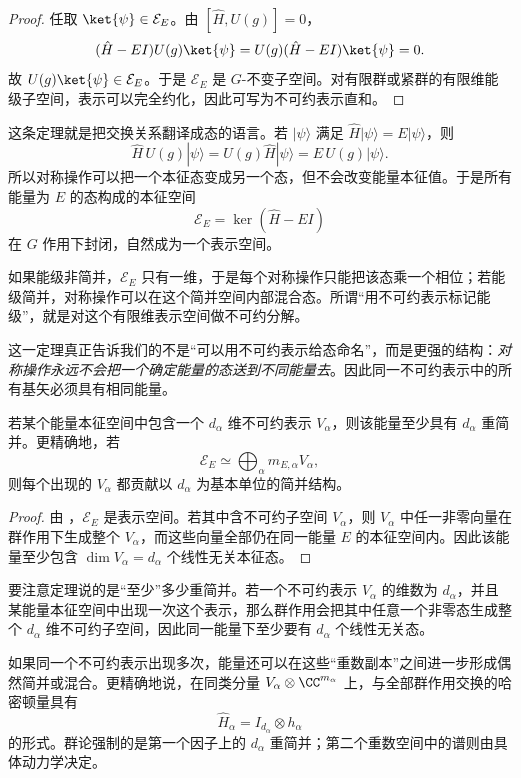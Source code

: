 \begin{proof}
任取 $\ket{\psi}\in\mathcal E_E$。由 $[\hat H,U(g)]=0$，
\[
(\hat H-EI)U(g)\ket{\psi}
=U(g)(\hat H-EI)\ket{\psi}=0.
\]
故 $U(g)\ket{\psi}\in\mathcal E_E$。于是 $\mathcal E_E$ 是 $G$-不变子空间。对有限群或紧群的有限维能级子空间，表示可以完全约化，因此可写为不可约表示直和。
\end{proof}

这条定理就是把交换关系翻译成态的语言。若 $|\psi\rangle$ 满足 $\hat H|\psi\rangle=E|\psi\rangle$，则
\[
\hat H\,U(g)|\psi\rangle
=U(g)\hat H|\psi\rangle
=E\,U(g)|\psi\rangle.
\]
所以对称操作可以把一个本征态变成另一个态，但不会改变能量本征值。于是所有能量为 $E$ 的态构成的本征空间
\[
\mathcal E_E=\ker(\hat H-EI)
\]
在 $G$ 作用下封闭，自然成为一个表示空间。

如果能级非简并，$\mathcal E_E$ 只有一维，于是每个对称操作只能把该态乘一个相位；若能级简并，对称操作可以在这个简并空间内部混合态。所谓“用不可约表示标记能级”，就是对这个有限维表示空间做不可约分解。

这一定理真正告诉我们的不是“可以用不可约表示给态命名”，而是更强的结构：\emph{对称操作永远不会把一个确定能量的态送到不同能量去}。因此同一不可约表示中的所有基矢必须具有相同能量。

\begin{theorem}[不可约表示给出的必然简并]
若某个能量本征空间中包含一个 $d_\alpha$ 维不可约表示 $V_\alpha$，则该能量至少具有 $d_\alpha$ 重简并。更精确地，若
\[
\mathcal E_E\simeq\bigoplus_\alpha m_{E,\alpha}V_\alpha,
\]
则每个出现的 $V_\alpha$ 都贡献以 $d_\alpha$ 为基本单位的简并结构。
\label{thm:symmetry-enforced-degeneracy}

\end{theorem}

\begin{proof}
由 ，$\mathcal E_E$ 是表示空间。若其中含不可约子空间 $V_\alpha$，则 $V_\alpha$ 中任一非零向量在群作用下生成整个 $V_\alpha$，而这些向量全部仍在同一能量 $E$ 的本征空间内。因此该能量至少包含 $\dim V_\alpha=d_\alpha$ 个线性无关本征态。
\end{proof}

要注意定理说的是“至少”多少重简并。若一个不可约表示 $V_\alpha$ 的维数为 $d_\alpha$，并且某能量本征空间中出现一次这个表示，那么群作用会把其中任意一个非零态生成整个 $d_\alpha$ 维不可约子空间，因此同一能量下至少要有 $d_\alpha$ 个线性无关态。

如果同一个不可约表示出现多次，能量还可以在这些“重数副本”之间进一步形成偶然简并或混合。更精确地说，在同类分量 $V_\alpha\otimes\CC^{m_\alpha}$ 上，与全部群作用交换的哈密顿量具有
\[
\hat H_\alpha=I_{d_\alpha}\otimes h_\alpha
\]
的形式。群论强制的是第一个因子上的 $d_\alpha$ 重简并；第二个重数空间中的谱则由具体动力学决定。

